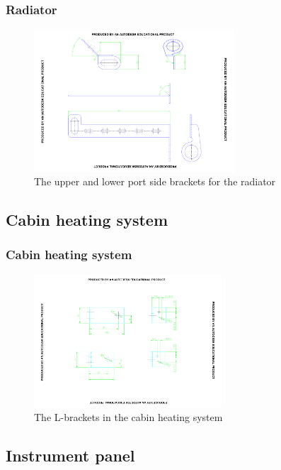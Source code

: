 \documentclass{beamer}
\begin{document}
\begin{frame}\frametitle{Radiator}
\begin{figure}[ht!]
	\begin{center}
		\includegraphics[width=7.5cm,trim = 2cm 1cm 2cm 1cm, clip]{pics/PIC007.pdf}
		\caption{The upper and lower port side brackets for the radiator}
		\label{fig:PIC007}
	\end{center}
\end{figure}
\end{frame}

\subsection{Cabin heating system}

\begin{frame}\frametitle{Cabin heating system}
\begin{figure}[ht!]
	\begin{center}
		\includegraphics[width=7cm,trim = 6cm 4cm 6cm 3cm, clip]{pics/PIC009.pdf}
		\caption{The L-brackets in the cabin heating system}
		\label{fig:PIC009}
	\end{center}
\end{figure}
\end{frame}

\subsection{Instrument panel}
\end{document}
